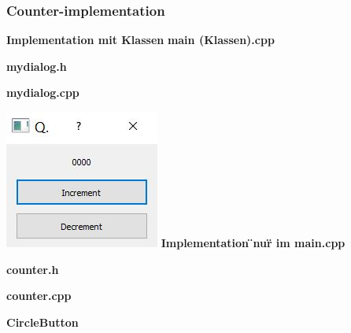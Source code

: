 \subsubsection{Counter-implementation}
\begin{multicols}{2}
    \begin{minipage}{\linewidth}
       \textbf{Implementation mit Klassen}\newline
       \textbf{main (Klassen).cpp}
       
       \textbf{mydialog.h}
       
       \textbf{mydialog.cpp}
       
    \end{minipage}

    \begin{minipage}{\linewidth}
        \includegraphics[width=0.5\linewidth]{images/count1}\newline
        \textbf{Implementation \"{}nur\"{} im main.cpp}
        
    \end{minipage}
\end{multicols}
\clearpage
\textbf{counter.h}\newline

\textbf{counter.cpp}\newline

\clearpage
\textbf{CircleButton}
